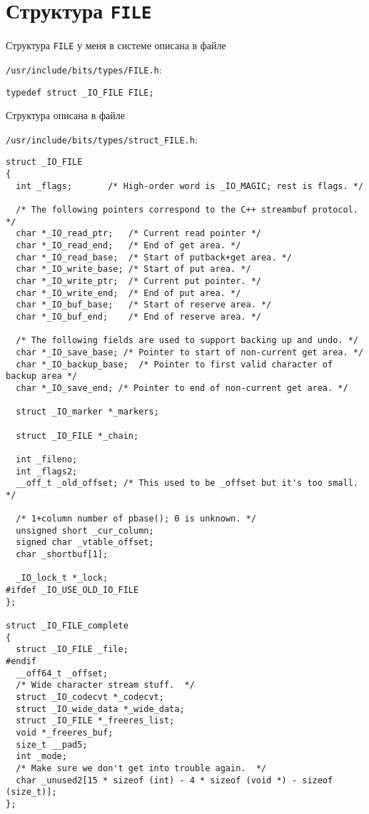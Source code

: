 \chapter*{Структура \texttt{FILE}}

Структура \texttt{FILE} у меня в системе описана в файле 

\texttt{/usr/include/bits/types/FILE.h}:

\begin{lstlisting}[style=cstyle]
typedef struct _IO_FILE FILE;
\end{lstlisting}

Структура \texttt{} описана в файле 

\texttt{/usr/include/bits/types/struct\_FILE.h}:

\begin{lstlisting}[style=cstyle]
struct _IO_FILE
{
  int _flags;		/* High-order word is _IO_MAGIC; rest is flags. */

  /* The following pointers correspond to the C++ streambuf protocol. */
  char *_IO_read_ptr;	/* Current read pointer */
  char *_IO_read_end;	/* End of get area. */
  char *_IO_read_base;	/* Start of putback+get area. */
  char *_IO_write_base;	/* Start of put area. */
  char *_IO_write_ptr;	/* Current put pointer. */
  char *_IO_write_end;	/* End of put area. */
  char *_IO_buf_base;	/* Start of reserve area. */
  char *_IO_buf_end;	/* End of reserve area. */

  /* The following fields are used to support backing up and undo. */
  char *_IO_save_base; /* Pointer to start of non-current get area. */
  char *_IO_backup_base;  /* Pointer to first valid character of backup area */
  char *_IO_save_end; /* Pointer to end of non-current get area. */

  struct _IO_marker *_markers;

  struct _IO_FILE *_chain;

  int _fileno;
  int _flags2;
  __off_t _old_offset; /* This used to be _offset but it's too small.  */

  /* 1+column number of pbase(); 0 is unknown. */
  unsigned short _cur_column;
  signed char _vtable_offset;
  char _shortbuf[1];

  _IO_lock_t *_lock;
#ifdef _IO_USE_OLD_IO_FILE
};

struct _IO_FILE_complete
{
  struct _IO_FILE _file;
#endif
  __off64_t _offset;
  /* Wide character stream stuff.  */
  struct _IO_codecvt *_codecvt;
  struct _IO_wide_data *_wide_data;
  struct _IO_FILE *_freeres_list;
  void *_freeres_buf;
  size_t __pad5;
  int _mode;
  /* Make sure we don't get into trouble again.  */
  char _unused2[15 * sizeof (int) - 4 * sizeof (void *) - sizeof (size_t)];
};
\end{lstlisting}

